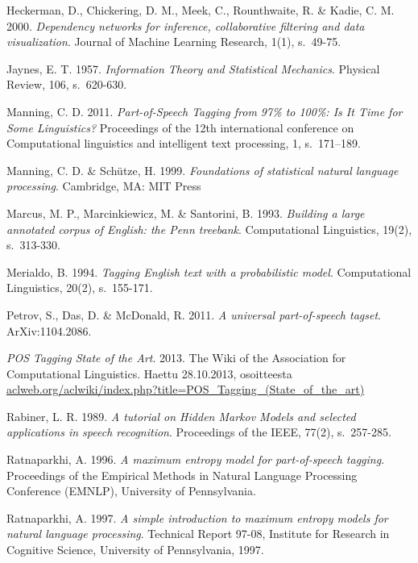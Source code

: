 \documentclass[utf8,bachelor,manualbib]{gradu3}
\begin{document}
\begin{thebibliography}{}
Heckerman, D., Chickering, D. M., Meek, C., Rounthwaite, R. \& Kadie, C. M. 2000. \textit{Dependency networks for inference, collaborative filtering and data visualization}.
Journal of Machine Learning Research, 1(1), s.~49-75.

Jaynes, E. T. 1957. \textit{Information Theory and Statistical Mechanics}. Physical Review, 106, s.~620-630.

Manning, C. D. 2011. \textit{Part-of-Speech Tagging from 97\% to 100\%: Is It Time for Some Linguistics?} Proceedings of the 12th international conference on Computational linguistics and intelligent text processing, 1, s.~171--189.

Manning, C. D. \& Schütze, H. 1999. \textit{Foundations of statistical natural language processing}.
Cambridge, MA: MIT Press

Marcus, M. P., Marcinkiewicz, M. \& Santorini, B. 1993. \textit{Building a large annotated corpus of English: the Penn treebank}. Computational Linguistics, 19(2), s.~313-330.

Merialdo, B. 1994. \textit{Tagging English text with a probabilistic model}. Computational Linguistics, 20(2), s.~155-171.

Petrov, S., Das, D. \& McDonald, R. 2011.
\textit{A universal part-of-speech tagset}. ArXiv:1104.2086.

\textit{POS Tagging State of the Art}. 2013. The Wiki of the Association for Computational Linguistics.
Haettu 28.10.2013, osoitteesta \url{aclweb.org/aclwiki/index.php?title=POS_Tagging_(State_of_the_art)}

Rabiner, L. R. 1989. \textit{A tutorial on Hidden Markov Models and selected applications in speech recognition}. Proceedings of the IEEE, 77(2), s.~257-285.

Ratnaparkhi, A. 1996. \textit{A maximum entropy model for part-of-speech tagging}. Proceedings of the Empirical Methods in Natural Language Processing Conference (EMNLP), University of Pennsylvania.

Ratnaparkhi, A. 1997. \textit{ A simple introduction to maximum entropy models for natural language processing}.
Technical Report 97-08, Institute for Research in Cognitive Science, University of Pennsylvania, 1997.


\end{thebibliography}
\end{document}
